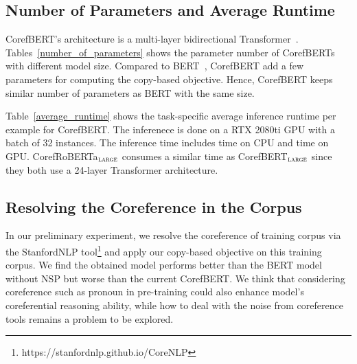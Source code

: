 \documentclass[11pt,a4paper]{article}
\newcommand\CorefBERT{CorefBERT\xspace}
\newcommand\LARGESIZE{$_{\small \textsc{large}}$\xspace}
\begin{document}
\subsection{Number of Parameters and Average Runtime}

CorefBERT's architecture is a multi-layer bidirectional Transformer~\citep{Transformer}. Tables~\ref{number_of_parameters} shows the  parameter number of CorefBERTs with different model size. Compared to BERT~\citep{BERT}, \CorefBERT add a few parameters for computing the copy-based objective. Hence, \CorefBERT keeps similar number of parameters as BERT with the same size.


Table~\ref{average_runtime} shows the task-specific average inference runtime per example for CorefBERT. The inferenece is done on a RTX 2080ti GPU with a batch of 32 instances. The inference time includes time on CPU and time on GPU. CorefRoBERTa\LARGESIZE consumes a similar time as CorefBERT\LARGESIZE since they both use a 24-layer Transformer architecture.


\subsection{Resolving the Coreference in the Corpus}
In our preliminary experiment, we resolve the coreference of training corpus via the StanfordNLP tool\footnote{{https://stanfordnlp.github.io/CoreNLP}} and apply our copy-based objective on this training corpus. We find the obtained model performs better than the BERT model without NSP but worse than the current CorefBERT. We think that considering coreference such as pronoun in pre-training could also enhance model's coreferential reasoning ability, while how to deal with the noise from coreference tools remains a problem to be explored.
\end{document}
